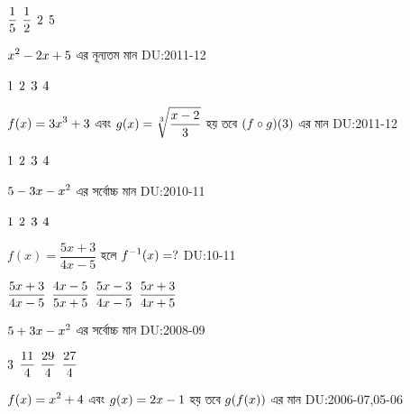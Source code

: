 \documentclass[addpoints]{exam}
\begin{document}
\begin{questions}
\begin{oneparchoices}
 \choice $\mathlarger{\frac{1}{5} }$
 \choice $\mathlarger{\frac{1}{2}}$
 \choice $\mathlarger{2}$
 \choice $\mathlarger{5}$
\end{oneparchoices}

\question $\mathlarger{x^{2}-2x+5}$ এর নূন্যতম মান   \hfill \textsc{DU:2011-12}

\begin{oneparchoices}
 \choice $\mathlarger{1 }$
 \choice $\mathlarger{2}$
 \choice $\mathlarger{3}$
 \choice $\mathlarger{4}$
\end{oneparchoices}

\question $\mathlarger{f(x) = 3x^{3}+3}$ এবং $\mathlarger{g(x)=\sqrt[3]{\frac{x-2}{3}}}$ হয় তবে  $\mathlarger{(f \circ g)(3)}$ এর মান  \hfill \textsc{DU:2011-12}

\begin{oneparchoices}
 \choice $\mathlarger{1 }$
 \choice $\mathlarger{2}$
 \choice $\mathlarger{3}$
 \choice $\mathlarger{4}$
\end{oneparchoices}

\question $\mathlarger{5-3x-x^{2}}$ এর সর্বোচ্চ মান  \hfill \textsc{DU:2010-11}

\begin{oneparchoices}
 \choice $\mathlarger{1 }$
 \choice $\mathlarger{2}$
 \choice $\mathlarger{3}$
 \choice $\mathlarger{4}$
\end{oneparchoices}

\question $ f(x) = \dfrac{5x+3}{4x-5}$ হলে  $\mathlarger{f^{-1}(x)=?}$ \hfill \textsc{DU:10-11}

\begin{oneparchoices}
 \choice $\mathlarger{\frac{5x+3}{4x-5} }$
 \hspace*{1cm}\choice $\mathlarger{\frac{4x-5}{5x+5} }$
 \choice $\mathlarger{\frac{5x-3}{4x-5} }$
 \hspace*{1cm}\choice $\mathlarger{\frac{5x+3}{4x+5} }$
\end{oneparchoices}

\question $\mathlarger{5+3x-x^{2}}$ এর সর্বোচ্চ মান  \hfill \textsc{DU:2008-09}

\begin{oneparchoices}
 \choice $\mathlarger{3 }$
 \choice $\mathlarger{\frac{11}{4}}$
 \choice $\mathlarger{\frac{29}{4}}$
 \choice $\mathlarger{\frac{27}{4}}$
\end{oneparchoices}

\question $\mathlarger{f(x) = x^{2}+4}$ এবং $\mathlarger{g(x)=2x-1}$ হয় তবে  $\mathlarger{g( f(x))}$ এর মান  \hfill \textsc{DU:2006-07,05-06}


\end{questions}
\end{document}
